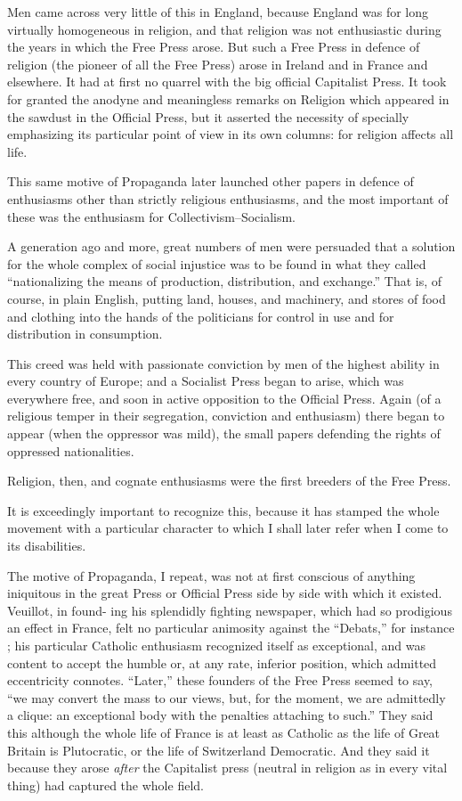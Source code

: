 \documentclass{book}
\begin{document}
Men came across very little of this in England, because England was for long virtually homogeneous in religion, and that religion was not enthusiastic during the years in which the Free Press arose. But such a Free Press in defence of religion (the pioneer of all the Free Press) arose in Ireland and in France and elsewhere. It had at first no quarrel with the big official Capitalist Press. It took for granted the anodyne and meaningless remarks on Religion which appeared in the sawdust in the Official Press, but it asserted the necessity of specially emphasizing its particular point of view in its own columns: for religion affects all life.

This same motive of Propaganda later launched other papers in defence of enthusiasms other than strictly religious enthusiasms, and the most important of these was the enthusiasm for Collectivism–Socialism.

A generation ago and more, great numbers of men were persuaded that a solution for the whole complex of social injustice was to be found in what they called “nationalizing the means of production, distribution, and exchange.” That is, of course, in plain English, putting land, houses, and machinery, and stores of food and clothing into the hands of the politicians for control in use and for distribution in consumption.

This creed was held with passionate conviction by men of the highest ability in every country of Europe; and a Socialist Press began to arise, which was everywhere free, and soon in active opposition to the Official Press. Again (of a religious temper in their segregation, conviction and enthusiasm) there began to appear (when the oppressor was mild), the small papers defending the rights of oppressed nationalities.

Religion, then, and cognate enthusiasms were the first breeders of the Free Press.

It is exceedingly important to recognize this, because it has stamped the whole movement with a particular character to which I shall later refer when I come to its disabilities.

The motive of Propaganda, I repeat, was not at first conscious of anything iniquitous in the great Press or Official Press side by side with which it existed. Veuillot, in found- ing his splendidly fighting newspaper, which had so prodigious an effect in France, felt no particular animosity against the “Debats,” for instance ; his particular Catholic enthusiasm recognized itself as exceptional, and was content to accept the humble or, at any rate, inferior position, which admitted eccentricity connotes. “Later,” these founders of the Free Press seemed to say, “we may convert the mass to our views, but, for the moment, we are admittedly a clique: an exceptional body with the penalties attaching to such.” They said this although the whole life of France is at least as Catholic as the life of Great Britain is Plutocratic, or the life of Switzerland Democratic. And they said it because they arose \emph{after} the Capitalist press (neutral in religion as in every vital thing) had captured the whole field.
\end{document}
